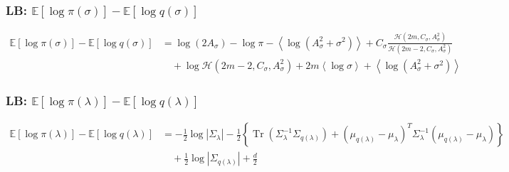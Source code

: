 \documentclass[11pt]{article}
\DeclareMathOperator{\Tr}{Tr}
\begin{document}
\subsubsection{LB: $\mathbb{E}\left[\log \pi\left(\sigma\right) \right]-\mathbb{E}\left[\log q\left(\sigma\right)\right] $}
\begin{align*}
  \mathbb{E}\left[\log \pi\left(\sigma\right) \right] - \mathbb{E}\left[\log q\left(\sigma\right) \right] &= \log \left(2A_{\sigma}\right) - \log \pi -\left\langle \log \left(A_{\sigma}^{2}+\sigma^{2}\right)\right\rangle + C_{\sigma}\frac{\mathcal{H}\left(2m, C_{\sigma}, A_{\sigma}^{2}\right)}{\mathcal{H}\left(2m-2, C_{\sigma}, A_{\sigma}^{2}\right)} \\
  &\quad +\log \mathcal{H}\left(2m-2, C_{\sigma}, A_{\sigma}^{2}\right) +2m\left\langle \log \sigma \right\rangle +\left\langle \log\left(A_{\sigma}^{2}+\sigma^{2}\right)\right\rangle 
\end{align*}
\subsubsection{LB: $\mathbb{E}\left[\log \pi\left(\lambda\right) \right]- \mathbb{E}\left[\log q\left(\lambda\right) \right] $}
\begin{align*}
  \mathbb{E}\left[\log \pi\left(\lambda\right) \right]- \mathbb{E}\left[\log q\left(\lambda\right) \right] &= -\frac{1}{2}\log \left|\Sigma_{\lambda}\right| -\frac{1}{2}\left\{\Tr\left(\Sigma_{\lambda}^{-1}\Sigma_{q\left(\lambda\right)}\right) + \left(\mu_{q\left(\lambda\right)}-\mu_{\lambda}  \right)^{T}\Sigma_{\lambda}^{-1}\left(\mu_{q\left(\lambda\right)}-\mu_{\lambda} \right) \right\}\\
  &\quad +\frac{1}{2}\log \left|\Sigma_{q\left(\lambda\right)}\right| +\frac{d}{2}
\end{align*}
\end{document}
